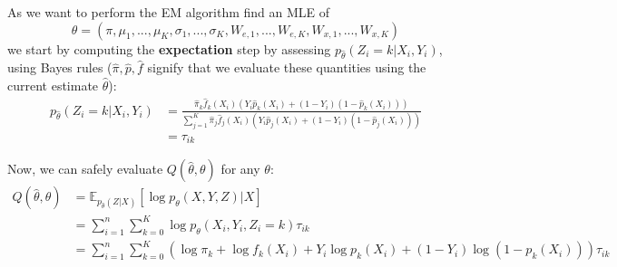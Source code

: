 As we want to perform the EM algorithm find an MLE of
$$
\theta = (\pi, \mu_1, ..., \mu_K, \sigma_1, ..., \sigma_K, W_{e,1}, ..., W_{e,K}, W_{x,1}, ..., W_{x,K})
$$
we start by computing the \textbf{expectation} step by assessing $p_{\widehat{\theta}}(Z_i = k|X_i,Y_i)$, using Bayes rules ($\hat{\pi}, \hat{p}, \hat{f}$ signify that we evaluate these quantities using the current estimate $\widehat{\theta}$):
$$
\begin{align}
    p_{\widehat{\theta}}(Z_i = k|X_i, Y_i) &= \frac{\hat{\pi}_k \hat{f}_k(X_i) \left(Y_i \hat{p}_k(X_i) + (1 - Y_i) (1 - \hat{p}_k(X_i)) \right)}{\sum_{j=1}^K \hat{\pi}_j \hat{f}_j(X_i) \left(Y_i \hat{p}_j(X_i) + (1 - Y_i) (1 - \hat{p}_j(X_i)) \right)}
    \\&= \tau_{ik}
\end{align}
$$

Now, we can safely evaluate $Q(\widehat{\theta}, \theta)$ for any $\theta$:
$$
\begin{align}
    Q(\widehat{\theta}, \theta) &= \mathbb{E}_{p_{\widehat{\theta}}(Z|X)}[\log p_{\theta}(X, Y, Z) | X] \\
                                &= \sum_{i=1}^n \sum_{k=0}^K \log p_{\theta}(X_i, Y_i, Z_i = k) \tau_{ik} \\
                                &= \sum_{i=1}^n \sum_{k=0}^K (\log \pi_k + \log f_k(X_i) + Y_i \log p_k(X_i) + (1 - Y_i) \log (1-p_k(X_i))) \tau_{ik} \\
\end{align}
$$

